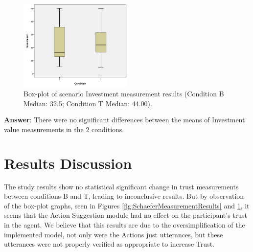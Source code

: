 \begin{figure}[hbt]
    \centering
    \includegraphics[width=0.5\textwidth]{graphs/InvestmentBoxPlot.png}
    \caption{Box-plot of scenario Investment measurement results (Condition B Median: 32.5; Condition T Median: 44.00).}
    \label{fig:InvestmentBoxPlot}
\end{figure}

\textbf{Answer}: There were no significant differences between the means of Investment value measurements in the 2 conditions.

\section{Results Discussion}
The study results show no statistical significant change in trust measurements between conditions B and T, leading to inconclusive results. But by observation of the box-plot graphs, seen in Figures \ref{fig:SchaeferMeasurementResults} and \ref{fig:InvestmentBoxPlot}, it seems that the Action Suggestion module had no effect on the participant's trust in the agent.
We believe that this results are due to the oversimplification of the implemented model, not only were the Actions just utterances, but these utterances were not properly verified as appropriate to increase Trust.